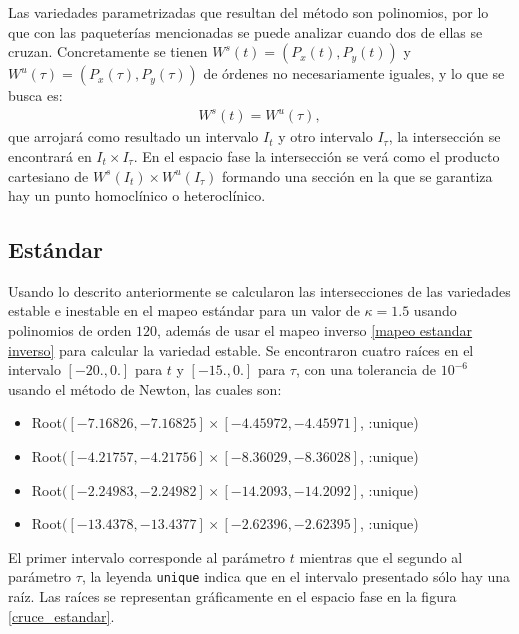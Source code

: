Las variedades parametrizadas que resultan del método son polinomios, por lo que con las paqueterías  mencionadas se puede analizar cuando dos de ellas se cruzan. Concretamente se tienen  $W^{s}(t)=(P_{x}(t),P_{y}(t))$ y $W^{u}(\tau)=(P_{x}(\tau),P_{y}(\tau))$ de órdenes no necesariamente iguales, y lo que se busca es:
\begin{eqnarray}
W^{s}(t)=W^{u}(\tau),
\end{eqnarray}
que arrojará como resultado un intervalo $I_{t}$ y otro intervalo $I_{\tau}$, la intersección se encontrará en $I_{t}\times I_{\tau}$. En el espacio fase la intersección se verá como el producto cartesiano de $W^{s}(I_{t})\times W^{u}(I_{\tau})$ formando una sección en la que se garantiza hay un punto homoclínico o heteroclínico. 


\subsection{Estándar}
Usando lo descrito anteriormente se calcularon las intersecciones de las variedades estable e inestable en el mapeo estándar para un valor de $\kappa=1.5$ usando polinomios de orden $120$, además de usar el mapeo inverso \ref{mapeo estandar inverso} para calcular la variedad estable. Se encontraron cuatro raíces en el intervalo $[-20.,0.]$ para $t$  y $[-15.,0.]$ para $\tau$, con una tolerancia de $10^{-6}$ usando el método de Newton, las cuales son:
\begin{itemize}
\item Root$([-7.16826, -7.16825] \times [-4.45972, -4.45971]$, :unique)
\item Root$([-4.21757, -4.21756] \times [-8.36029, -8.36028]$, :unique)
\item Root$([-2.24983, -2.24982] \times [-14.2093, -14.2092]$, :unique)
\item Root$([-13.4378, -13.4377] \times [-2.62396, -2.62395]$, :unique)
\end{itemize}
El primer intervalo corresponde al parámetro $t$ mientras que el segundo al parámetro $\tau$, la leyenda \texttt{unique} indica que en el intervalo presentado sólo hay una raíz. Las raíces se representan gráficamente en el espacio fase en la figura \ref{cruce_estandar}. 

